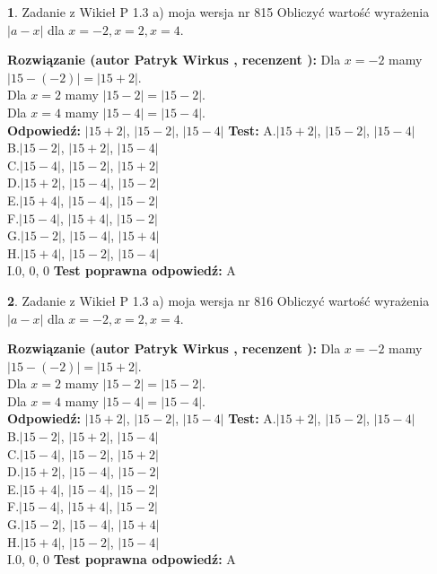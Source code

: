 \documentclass[12pt, a4paper]{article}
\theoremstyle{definition} %
\newtheorem{zad}{}
\newcommand{\zadStart}[1]{\begin{zad}#1\newline}
\newcommand{\zadStop}{\end{zad}}
\newcommand{\rozwStart}[2]{\noindent \textbf{Rozwiązanie (autor #1 , recenzent #2): }\newline}
\newcommand{\rozwStop}{\newline}
\newcommand{\odpStart}{\noindent \textbf{Odpowiedź:}\newline}
\newcommand{\odpStop}{\newline}
\newcommand{\testStart}{\noindent \textbf{Test:}\newline}
\newcommand{\testStop}{\newline}
\newcommand{\kluczStart}{\noindent \textbf{Test poprawna odpowiedź:}\newline}
\newcommand{\kluczStop}{\newline}
\begin{document}
\zadStart{Zadanie z Wikieł P 1.3 a) moja wersja nr 815}
Obliczyć wartość wyrażenia $|a - x|$ dla $x=-2,x=2,x=4$.
\zadStop
\rozwStart{Patryk Wirkus}{}
Dla $x = -2$ mamy $|15 - (-2)| = |15 + 2|$.\\
Dla $x = 2$ mamy $|15 - 2| = |15 - 2|$.\\
Dla $x = 4$ mamy $|15 - 4| = |15 - 4|$.\\
\rozwStop
\odpStart
$|15 + 2|$, $|15 - 2|$, $|15 - 4|$
\odpStop
\testStart
A.$|15 + 2|$, $|15 - 2|$, $|15 - 4|$\\
B.$|15 - 2|$, $|15 + 2|$, $|15 - 4|$\\
C.$|15 - 4|$, $|15 - 2|$, $|15 + 2|$\\
D.$|15 + 2|$, $|15 - 4|$, $|15 - 2|$\\
E.$|15 + 4|$, $|15 - 4|$, $|15 - 2|$\\
F.$|15 - 4|$, $|15 + 4|$, $|15 - 2|$\\
G.$|15 - 2|$, $|15 - 4|$, $|15 + 4|$\\
H.$|15 + 4|$, $|15 - 2|$, $|15 - 4|$\\
I.$0$, $0$, $0$
\testStop
\kluczStart
A
\kluczStop



\zadStart{Zadanie z Wikieł P 1.3 a) moja wersja nr 816}
Obliczyć wartość wyrażenia $|a - x|$ dla $x=-2,x=2,x=4$.
\zadStop
\rozwStart{Patryk Wirkus}{}
Dla $x = -2$ mamy $|15 - (-2)| = |15 + 2|$.\\
Dla $x = 2$ mamy $|15 - 2| = |15 - 2|$.\\
Dla $x = 4$ mamy $|15 - 4| = |15 - 4|$.\\
\rozwStop
\odpStart
$|15 + 2|$, $|15 - 2|$, $|15 - 4|$
\odpStop
\testStart
A.$|15 + 2|$, $|15 - 2|$, $|15 - 4|$\\
B.$|15 - 2|$, $|15 + 2|$, $|15 - 4|$\\
C.$|15 - 4|$, $|15 - 2|$, $|15 + 2|$\\
D.$|15 + 2|$, $|15 - 4|$, $|15 - 2|$\\
E.$|15 + 4|$, $|15 - 4|$, $|15 - 2|$\\
F.$|15 - 4|$, $|15 + 4|$, $|15 - 2|$\\
G.$|15 - 2|$, $|15 - 4|$, $|15 + 4|$\\
H.$|15 + 4|$, $|15 - 2|$, $|15 - 4|$\\
I.$0$, $0$, $0$
\testStop
\kluczStart
A
\kluczStop
\end{document}
